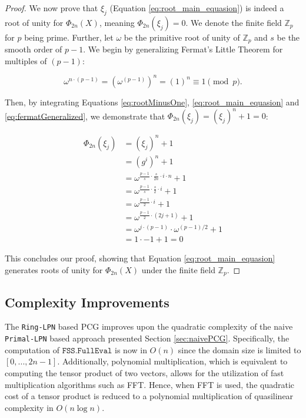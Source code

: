 \begin{proof}
We now prove that $\xi_j$ (Equation \ref{eq:root_main_equasion}) is indeed a root of unity for $\Phi_{2n}(X)$, meaning $\Phi_{2n}(\xi_j)=0$. We denote the finite field $\mathbb{Z}_p$ for $p$ being prime. Further, let $\omega$ be the primitive root of unity of $\mathbb{Z}_p$ and $s$ be the smooth order of $p-1$. We begin by generalizing Fermat's Little Theorem for multiples of $(p-1)$:

\begin{equation}
\label{eq:fermatGeneralized}
\omega^{n\cdot(p-1)} = \left(\omega^{(p-1)}\right)^n = \left(1\right)^n \equiv 1 \pmod{p}.
\end{equation}

Then, by integrating Equations \ref{eq:rootMinusOne}, \ref{eq:root_main_equasion} and \ref{eq:fermatGeneralized}, we demonstrate that $\Phi_{2n}(\xi_j) = (\xi_j)^n + 1 = 0$:

\begin{equation}
\begin{aligned}
\label{eq:rootProof}
\Phi_{2n}(\xi_j) &= (\xi_j)^n + 1 \\
   &= \left(g^i\right)^n + 1 \\
   &=\omega^{\frac{p-1}{s} \cdot  \frac{s}{2n} \cdot i \cdot n} + 1 \\
   &=\omega^{\frac{p-1}{s} \cdot \frac{s}{2} \cdot i} + 1\\
   &=\omega^{\frac{p-1}{2} \cdot i} + 1\\
   &=\omega^{\frac{p-1}{2} \cdot (2j + 1)} + 1\\
   &=\omega^{j \cdot (p-1)} \cdot \omega^{(p-1)/2} + 1\\
   &=1 \cdot -1 + 1 = 0
\end{aligned}
\end{equation}

This concludes our proof, showing that Equation \ref{eq:root_main_equasion} generates roots of unity for $\Phi_{2n}(X)$ under the finite field $\mathbb{Z}_p$. 
\end{proof}

\subsection{Complexity Improvements}
\label{subsec:VOLEConstruction}
The \texttt{Ring-LPN} based PCG improves upon the quadratic complexity of the naive \texttt{Primal-LPN} based approach presented Section \ref{sec:naivePCG}. Specifically, the computation of $\texttt{FSS.FullEval}$ is now in $O(n)$ since the domain size is limited to $[0, ..., 2n-1]$. Additionally, polynomial multiplication, which is equivalent to computing the tensor product of two vectors, allows for the utilization of fast multiplication algorithms such as FFT. Hence, when FFT is used, the quadratic cost of a tensor product is reduced to a polynomial multiplication of quasilinear complexity in $O(n \log n)$.


